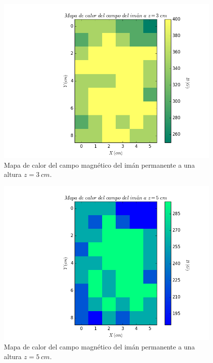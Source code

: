 \documentclass[twocolumn,showpacs,preprintnumbers,amsmath,amssymb]{revtex4-1}
\begin{document}
\begin{figure}
\includegraphics[scale=0.46]{figura_10.png}
\caption{\label{fig:epsart}Mapa de calor del campo magnético del imán permanente a una altura $z = 3\ cm$.}
\end{figure}

\begin{figure}
\includegraphics[scale=0.46]{figura_11.png}
\caption{\label{fig:epsart}Mapa de calor del campo magnético del imán permanente a una altura $z = 5\ cm$.}
\end{figure}
\end{document}
